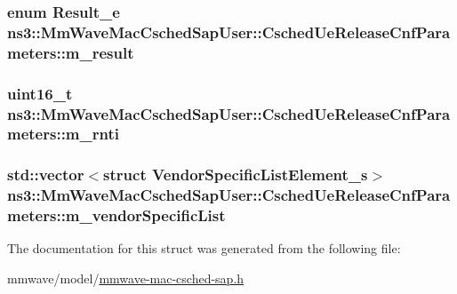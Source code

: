 \subsubsection[{\texorpdfstring{m\+\_\+result}{m_result}}]{\setlength{\rightskip}{0pt plus 5cm}enum {\bf Result\+\_\+e} ns3\+::\+Mm\+Wave\+Mac\+Csched\+Sap\+User\+::\+Csched\+Ue\+Release\+Cnf\+Parameters\+::m\+\_\+result}\hypertarget{structns3_1_1MmWaveMacCschedSapUser_1_1CschedUeReleaseCnfParameters_af430beb197bfaf4c2408692c6a7c7e69}{}\label{structns3_1_1MmWaveMacCschedSapUser_1_1CschedUeReleaseCnfParameters_af430beb197bfaf4c2408692c6a7c7e69}
\subsubsection[{\texorpdfstring{m\+\_\+rnti}{m_rnti}}]{\setlength{\rightskip}{0pt plus 5cm}uint16\+\_\+t ns3\+::\+Mm\+Wave\+Mac\+Csched\+Sap\+User\+::\+Csched\+Ue\+Release\+Cnf\+Parameters\+::m\+\_\+rnti}\hypertarget{structns3_1_1MmWaveMacCschedSapUser_1_1CschedUeReleaseCnfParameters_a804cc0c9ee5bf00e718d45174ad2e3e8}{}\label{structns3_1_1MmWaveMacCschedSapUser_1_1CschedUeReleaseCnfParameters_a804cc0c9ee5bf00e718d45174ad2e3e8}
\subsubsection[{\texorpdfstring{m\+\_\+vendor\+Specific\+List}{m_vendorSpecificList}}]{\setlength{\rightskip}{0pt plus 5cm}std\+::vector$<$struct {\bf Vendor\+Specific\+List\+Element\+\_\+s}$>$ ns3\+::\+Mm\+Wave\+Mac\+Csched\+Sap\+User\+::\+Csched\+Ue\+Release\+Cnf\+Parameters\+::m\+\_\+vendor\+Specific\+List}\hypertarget{structns3_1_1MmWaveMacCschedSapUser_1_1CschedUeReleaseCnfParameters_a10d3cf5e2c8eba4be7bfa38ccf746afd}{}\label{structns3_1_1MmWaveMacCschedSapUser_1_1CschedUeReleaseCnfParameters_a10d3cf5e2c8eba4be7bfa38ccf746afd}


The documentation for this struct was generated from the following file\+:\begin{DoxyCompactItemize}
\item 
mmwave/model/\hyperlink{mmwave-mac-csched-sap_8h}{mmwave-\/mac-\/csched-\/sap.\+h}\end{DoxyCompactItemize}
